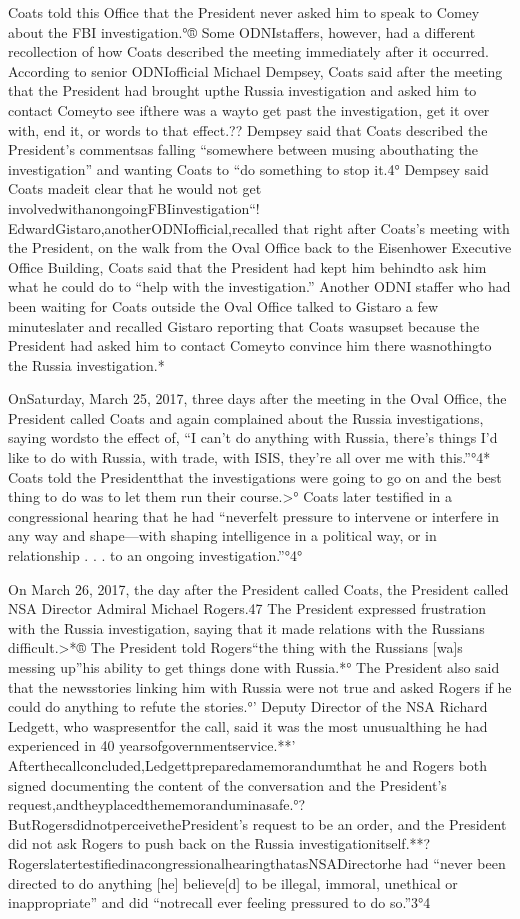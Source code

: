 Coats told this Office that the President never asked him to speak to Comey about the FBI investigation.°®
Some ODNIstaffers, however, had a different recollection of how Coats described the meeting immediately after it occurred.
According to senior ODNIofficial Michael Dempsey, Coats said after the meeting that the President had brought upthe Russia investigation and asked him to contact Comeyto see ifthere was a wayto get past the investigation, get it over with, end it, or words to that effect.??
Dempsey said that Coats described the President’s commentsas falling “somewhere between musing abouthating the investigation” and wanting Coats to “do something to stop it.4°
Dempsey said Coats madeit clear that he would not get involvedwithanongoingFBIinvestigation“!
EdwardGistaro,anotherODNIofficial,recalled that right after Coats’s meeting with the President, on the walk from the Oval Office back to the Eisenhower Executive Office Building, Coats said that the President had kept him behindto ask him what he could do to “help with the investigation.”
Another ODNI staffer who had been waiting for Coats outside the Oval Office talked to Gistaro a few minuteslater and recalled Gistaro reporting that Coats wasupset because the President had asked him to contact Comeyto convince him there wasnothingto the Russia investigation.*

OnSaturday, March 25, 2017, three days after the meeting in the Oval Office, the President called Coats and again complained about the Russia investigations, saying wordsto the effect of, “I can’t do anything with Russia, there’s things I’d like to do with Russia, with trade, with ISIS, they’re all over me with this.”°4*
Coats told the Presidentthat the investigations were going to go on and the best thing to do was to let them run their course.>°
Coats later testified in a congressional hearing that he had “neverfelt pressure to intervene or interfere in any way and shape—with shaping intelligence in a political way, or in relationship . . . to an ongoing investigation.”°4°

On March 26, 2017, the day after the President called Coats, the President called NSA Director Admiral Michael Rogers.47 The President expressed frustration with the Russia investigation, saying that it made relations with the Russians difficult.>*®
 The President told Rogers“the thing with the Russians [wa]s messing up”his ability to get things done with Russia.*°
The President also said that the newsstories linking him with Russia were not true and asked Rogers if he could do anything to refute the stories.°’
Deputy Director of the NSA Richard Ledgett, who waspresentfor the call, said it was the most unusualthing he had experienced in 40 yearsofgovernmentservice.**'
Afterthecallconcluded,Ledgettpreparedamemorandumthat he and Rogers both signed documenting the content of the conversation and the President’s request,andtheyplacedthememoranduminasafe.°?
ButRogersdidnotperceivethePresident’s request to be an order, and the President did not ask Rogers to push back on the Russia investigationitself.**?
RogerslatertestifiedinacongressionalhearingthatasNSADirectorhe had “never been directed to do anything [he] believe[d] to be illegal, immoral, unethical or inappropriate” and did “notrecall ever feeling pressured to do so.”3°4

